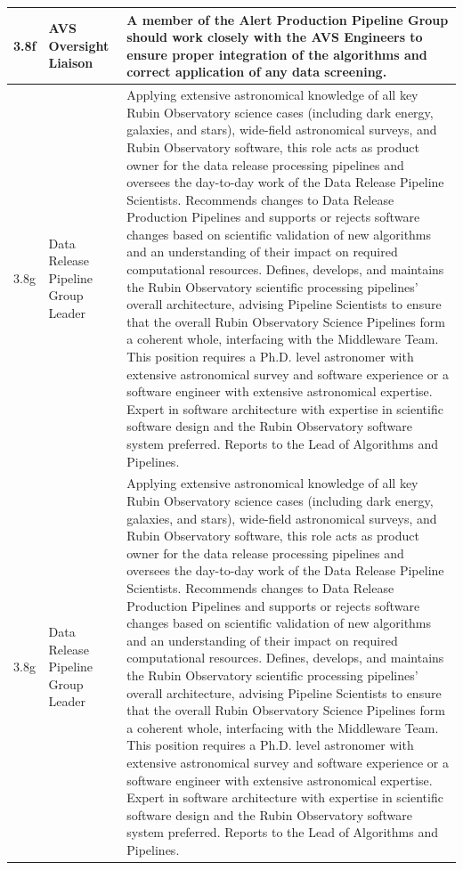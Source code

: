 \begin{longtable} {|p{}|p{}|p{}|}
{3.8f}&{AVS Oversight Liaison}&{A member of the Alert Production Pipeline Group should work closely with the AVS Engineers to ensure proper integration of the algorithms and correct application of any data screening. } \\ \hline
{3.8g}&{Data Release Pipeline Group Leader}&{Applying extensive astronomical knowledge of all key Rubin Observatory science cases  (including dark energy, galaxies, and stars), wide-field astronomical surveys, and Rubin Observatory software, this role acts as product owner for the data release processing pipelines and oversees the day-to-day work of the Data Release Pipeline Scientists. Recommends changes to Data Release Production Pipelines and supports or rejects software changes based on scientific validation of new algorithms and an understanding of their impact on required computational resources. Defines, develops, and maintains the Rubin Observatory scientific processing pipelines' overall architecture, advising Pipeline Scientists to ensure that the overall Rubin Observatory Science Pipelines form a coherent whole, interfacing with the Middleware Team.  This position requires a Ph.D. level astronomer with extensive astronomical survey and software experience or a software engineer with extensive astronomical expertise. Expert in software architecture with expertise in scientific software design and the Rubin Observatory software system preferred.  Reports to the Lead of Algorithms and Pipelines. } \\ \hline
{3.8g}&{Data Release Pipeline Group Leader}&{Applying extensive astronomical knowledge of all key Rubin Observatory science cases  (including dark energy, galaxies, and stars), wide-field astronomical surveys, and Rubin Observatory software, this role acts as product owner for the data release processing pipelines and oversees the day-to-day work of the Data Release Pipeline Scientists. Recommends changes to Data Release Production Pipelines and supports or rejects software changes based on scientific validation of new algorithms and an understanding of their impact on required computational resources. Defines, develops, and maintains the Rubin Observatory scientific processing pipelines' overall architecture, advising Pipeline Scientists to ensure that the overall Rubin Observatory Science Pipelines form a coherent whole, interfacing with the Middleware Team.  This position requires a Ph.D. level astronomer with extensive astronomical survey and software experience or a software engineer with extensive astronomical expertise. Expert in software architecture with expertise in scientific software design and the Rubin Observatory software system preferred.  Reports to the Lead of Algorithms and Pipelines. } \\ \hline

\end{longtable}
